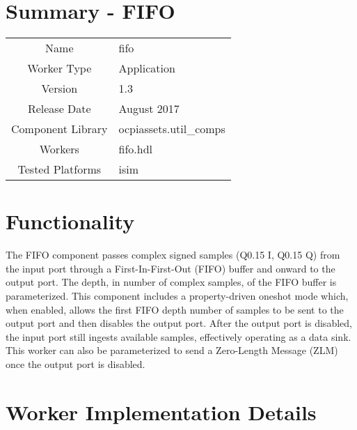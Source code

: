 \documentclass{article}
\author{} %
\date{Version \docVersion} %
\title{\docTitle}
\def\docVersion{1.3}
\def\comp{fifo}
\def\Comp{FIFO}
\begin{document}
\section*{Summary - \Comp}
\begin{tabular}{|c|M{13.5cm}|}
  \hline
                    &                                                              \\
  \hline
  Name              & \comp                                                        \\
  \hline
  Worker Type       & Application                                                  \\
  \hline
  Version           & \docVersion                                                 \\
  \hline
  Release Date      & August 2017                                               \\
  \hline
  Component Library & ocpiassets.util\_comps                                        \\
  \hline
  Workers           & \comp.hdl                                                    \\
  \hline
  Tested Platforms  & isim \\
  \hline
\end{tabular}

\section*{Functionality}
\begin{flushleft}
  The FIFO component passes complex signed samples (Q0.15 I, Q0.15 Q) from the input port through a First-In-First-Out (FIFO) buffer and onward to the output port. The depth, in number of complex samples, of the FIFO buffer is parameterized. This component includes a property-driven oneshot mode which, when enabled, allows the first FIFO depth number of samples to be sent to the output port and then disables the output port. After the output port is disabled, the input port still ingests available samples, effectively operating as a data sink. This worker can also be parameterized to send a Zero-Length Message (ZLM) once the output port is disabled.
\end{flushleft}

\section*{Worker Implementation Details}
\end{document}

